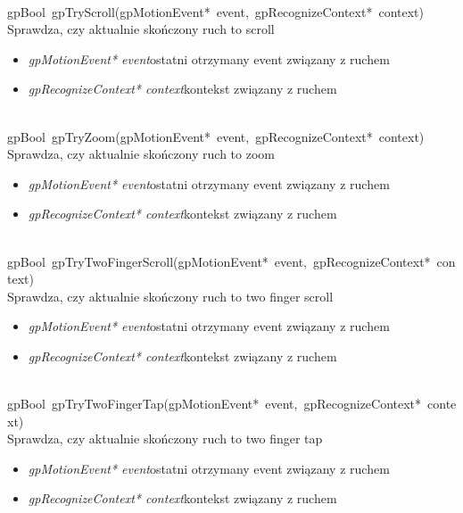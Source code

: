  \ \\
\mbox{\textsf{gpBool gpTryScroll(gpMotionEvent* event, gpRecognizeContext* context)}} \\ \indent Sprawdza, czy aktualnie skończony ruch to scroll
	\begin{itemize}
		\item \textit{gpMotionEvent* event}\quad ostatni otrzymany event związany z ruchem
		\item \textit{gpRecognizeContext* context}\quad kontekst związany z ruchem
	\end{itemize}

 \ \\
\mbox{\textsf{gpBool gpTryZoom(gpMotionEvent* event, gpRecognizeContext* context)}} \\ \indent Sprawdza, czy aktualnie skończony ruch to zoom
	\begin{itemize}
		\item \textit{gpMotionEvent* event}\quad ostatni otrzymany event związany z ruchem
		\item \textit{gpRecognizeContext* context}\quad kontekst związany z ruchem
	\end{itemize}

 \ \\
\mbox{\textsf{gpBool gpTryTwoFingerScroll(gpMotionEvent* event, gpRecognizeContext* context)}} \\ \indent Sprawdza, czy aktualnie skończony ruch to two finger scroll
	\begin{itemize}
		\item \textit{gpMotionEvent* event}\quad ostatni otrzymany event związany z ruchem
		\item \textit{gpRecognizeContext* context}\quad kontekst związany z ruchem
	\end{itemize}

 \ \\
\mbox{\textsf{gpBool gpTryTwoFingerTap(gpMotionEvent* event, gpRecognizeContext* context)}} \\ \indent Sprawdza, czy aktualnie skończony ruch to two finger tap
	\begin{itemize}
		\item \textit{gpMotionEvent* event}\quad ostatni otrzymany event związany z ruchem
		\item \textit{gpRecognizeContext* context}\quad kontekst związany z ruchem
	\end{itemize}

 \ \\
 
